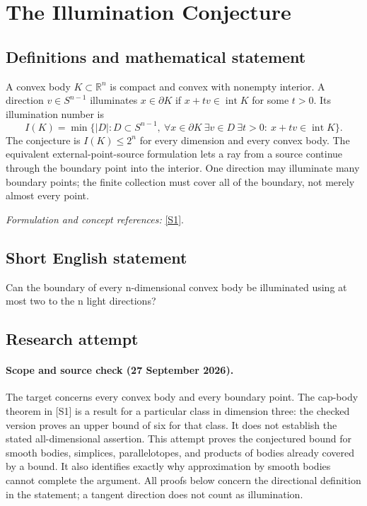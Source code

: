 \documentclass[11pt]{article}
\begin{document}
\section*{\texorpdfstring{The Illumination Conjecture}{The Illumination Conjecture}}\label{statement}
\subsection{Definitions and mathematical statement}
A convex body $K\subset{\mathbb{R}}^n$ is compact and convex with nonempty interior. A direction $v\in S^{n-1}$ illuminates $x\in\partial K$ if $x+tv\in\operatorname{int}K$ for some $t>0$. Its illumination number is
\[
 I(K)=\min\{|D|:D\subset S^{n-1},\
 \forall x\in\partial K\ \exists v\in D\ \exists t>0:\
 x+tv\in\operatorname{int}K\}.
\]
The conjecture is $I(K)\le2^n$ for every dimension and every convex body. The equivalent external-point-source formulation lets a ray from a source continue through the boundary point into the interior. One direction may illuminate many boundary points; the finite collection must cover all of the boundary, not merely almost every point.
\par\smallskip\textit{Formulation and concept references:} \href{https://arxiv.org/pdf/2507.08712}{[S1]}.

\subsection{Short English statement}
Can the boundary of every n-dimensional convex body be illuminated using at most two to the n light directions?
\subsection{Research attempt}
\paragraph{Scope and source check (27 September 2026).}
The target concerns every convex body and every boundary point. The cap-body theorem in [S1] is a result for a particular class in dimension three: the checked version proves an upper bound of six for that class. It does not establish the stated all-dimensional assertion. This attempt proves the conjectured bound for smooth bodies, simplices, parallelotopes, and products of bodies already covered by a bound. It also identifies exactly why approximation by smooth bodies cannot complete the argument. All proofs below concern the directional definition in the statement; a tangent direction does not count as illumination.
\end{document}

